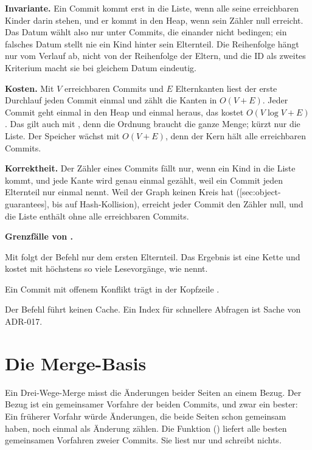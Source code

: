 {\bf Invariante.} Ein Commit kommt erst in die Liste, wenn alle seine erreichbaren Kinder darin
stehen, und er kommt in den Heap, wenn sein Zähler null erreicht.
Das Datum wählt also nur unter Commits, die einander nicht bedingen;
ein falsches Datum stellt nie ein Kind hinter sein Elternteil.
Die Reihenfolge hängt nur vom Verlauf ab, nicht von der Reihenfolge der Eltern,
und die ID als zweites Kriterium macht sie bei gleichem Datum eindeutig.

{\bf Kosten.} Mit $V$ erreichbaren Commits und $E$ Elternkanten liest der erste Durchlauf jeden
Commit einmal und zählt die Kanten in $O(V+E)$. Jeder Commit geht einmal in den Heap und einmal
heraus, das kostet $O(V\log V + E)$. Das gilt auch mit , denn die Ordnung braucht die
ganze Menge;  kürzt nur die Liste.
Der Speicher wächst mit $O(V+E)$, denn der Kern hält alle erreichbaren Commits.

{\bf Korrektheit.} Der Zähler eines Commits fällt nur, wenn ein Kind in die Liste kommt,
und jede Kante wird genau einmal gezählt, weil ein Commit jeden Elternteil nur einmal nennt.
Weil der Graph keinen Kreis hat ([sec:object-guarantees], bis auf Hash-Kollision),
erreicht jeder Commit den Zähler null, und die Liste enthält ohne  alle
erreichbaren Commits.

\startinfobox
{\bf Grenzfälle von .}
\startitemize
\item Mit  folgt der Befehl nur dem ersten Elternteil. Das Ergebnis ist eine
Kette und kostet mit  höchstens so viele Lesevorgänge, wie  nennt.
\item Ein Commit mit offenem Konflikt trägt in der Kopfzeile .
\item Der Befehl führt keinen Cache. Ein Index für schnellere Abfragen ist Sache von ADR-017.
\stopitemize
\stopinfobox

\section[sec:merge-base]{Die Merge-Basis}

Ein Drei-Wege-Merge misst die Änderungen beider Seiten an einem Bezug.
Der Bezug ist ein gemeinsamer Vorfahre der beiden Commits, und zwar ein bester:
Ein früherer Vorfahr würde Änderungen, die beide Seiten schon gemeinsam haben,
noch einmal als Änderung zählen.
Die Funktion  () liefert alle besten gemeinsamen Vorfahren
zweier Commits.
Sie liest nur und schreibt nichts.

